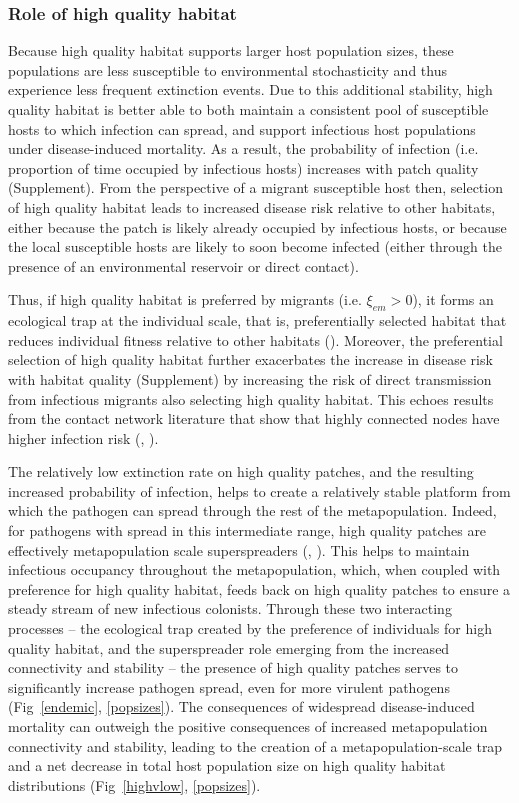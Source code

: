 \documentclass{article}
\begin{document}
\subsubsection*{Role of high quality habitat}

Because high quality habitat supports larger host population sizes, these populations are less susceptible to environmental stochasticity and thus experience less frequent extinction events.
Due to this additional stability, high quality habitat is better able to both maintain a consistent pool of susceptible hosts to which infection can spread, and support infectious host populations under disease-induced mortality. 
As a result, the probability of infection (i.e. proportion of time occupied by infectious hosts) increases with patch quality (Supplement).
From the perspective of a migrant susceptible host then, selection of high quality habitat leads to increased disease risk relative to other habitats, either because the patch is likely already occupied by infectious hosts, or because the local susceptible hosts are likely to soon become infected (either through the presence of an environmental reservoir or direct contact).

Thus, if high quality habitat is preferred by migrants (i.e. $\xi_{em} > 0$), it forms an ecological trap at the individual scale, that is, preferentially selected habitat that reduces individual fitness relative to other habitats (\cite{Robertson2006}).
Moreover, the preferential selection of high quality habitat further exacerbates the increase in disease risk with habitat quality (Supplement) by increasing the risk of direct transmission from infectious migrants also selecting high quality habitat.
This echoes results from the contact network literature that show that highly connected nodes have higher infection risk (\cite{Christley2005}, \cite{Keeling2005}).

The relatively low extinction rate on high quality patches, and the resulting increased probability of infection, helps to create a relatively stable platform from which the pathogen can spread through the rest of the metapopulation.
Indeed, for pathogens with spread in this intermediate range, high quality patches are effectively metapopulation scale superspreaders (\cite{Lloyd-Smith2005}, \cite{Paull2012}).  
This helps to maintain infectious occupancy throughout the metapopulation, which, when coupled with preference for high quality habitat, feeds back on high quality patches to ensure a steady stream of new infectious colonists. 
Through these two interacting processes -- the ecological trap created by the preference of individuals for high quality habitat, and the superspreader role emerging from the increased connectivity and stability -- the presence of high quality patches serves to significantly increase pathogen spread, even for more virulent pathogens (Fig~\ref{endemic}, \ref{popsizes}).
The consequences of widespread disease-induced mortality can outweigh the positive consequences of increased metapopulation connectivity and stability, leading to the creation of a metapopulation-scale trap and a net decrease in total host population size on high quality habitat distributions (Fig~\ref{highvlow}, \ref{popsizes}).  
\end{document}
